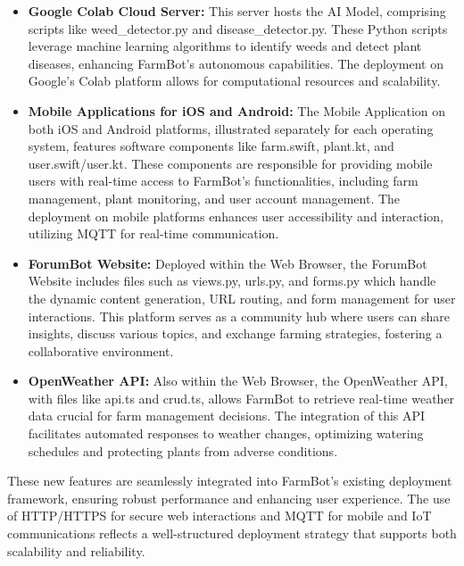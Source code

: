 \begin{itemize}
    \item \textbf{Google Colab Cloud Server:} This server hosts the AI Model, comprising scripts like weed\_detector.py and disease\_detector.py. These Python scripts leverage machine learning algorithms to identify weeds and detect plant diseases, enhancing FarmBot's autonomous capabilities. The deployment on Google's Colab platform allows for computational resources and scalability.
    \item \textbf{Mobile Applications for iOS and Android:} The Mobile Application on both iOS and Android platforms, illustrated separately for each operating system, features software components like farm.swift, plant.kt, and user.swift/user.kt. These components are responsible for providing mobile users with real-time access to FarmBot's functionalities, including farm management, plant monitoring, and user account management. The deployment on mobile platforms enhances user accessibility and interaction, utilizing MQTT for real-time communication.
    \item \textbf{ForumBot Website:} Deployed within the Web Browser, the ForumBot Website includes files such as views.py, urls.py, and forms.py which handle the dynamic content generation, URL routing, and form management for user interactions. This platform serves as a community hub where users can share insights, discuss various topics, and exchange farming strategies, fostering a collaborative environment.
    \item \textbf{OpenWeather API:} Also within the Web Browser, the OpenWeather API, with files like api.ts and crud.ts, allows FarmBot to retrieve real-time weather data crucial for farm management decisions. The integration of this API facilitates automated responses to weather changes, optimizing watering schedules and protecting plants from adverse conditions.
\end{itemize}
These new features are seamlessly integrated into FarmBot's existing deployment framework, ensuring robust performance and enhancing user experience. The use of HTTP/HTTPS for secure web interactions and MQTT for mobile and IoT communications reflects a well-structured deployment strategy that supports both scalability and reliability.

\newpage
